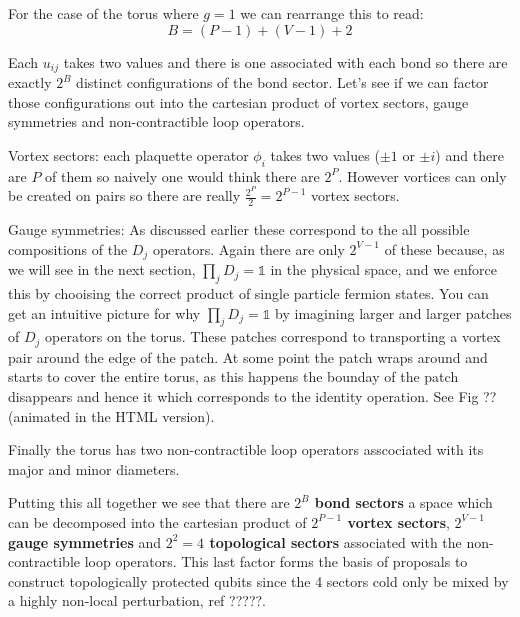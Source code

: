 For the case of the torus where \(g = 1\) we can rearrange this to read:
\[B = (P-1) + (V-1) + 2\]

Each \(u_{ij}\) takes two values and there is one associated with each
bond so there are exactly \(2^B\) distinct configurations of the bond
sector. Let's see if we can factor those configurations out into the
cartesian product of vortex sectors, gauge symmetries and
non-contractible loop operators.

Vortex sectors: each plaquette operator \(\phi_i\) takes two values
(\(\pm 1\) or \(\pm i\)) and there are \(P\) of them so naively one
would think there are \(2^P\). However vortices can only be created on
pairs so there are really \(\tfrac{2^P}{2} = 2^{P-1}\) vortex sectors.

Gauge symmetries: As discussed earlier these correspond to the all
possible compositions of the \(D_j\) operators. Again there are only
\(2^{V-1}\) of these because, as we will see in the next section,
\(\prod_{j} D_j = \mathbb{1}\) in the physical space, and we enforce
this by chooising the correct product of single particle fermion states.
You can get an intuitive picture for why \(\prod_{j} D_j = \mathbb{1}\)
by imagining larger and larger patches of \(D_j\) operators on the
torus. These patches correspond to transporting a vortex pair around the
edge of the patch. At some point the patch wraps around and starts to
cover the entire torus, as this happens the bounday of the patch
disappears and hence it which corresponds to the identity operation. See
Fig ?? (animated in the HTML version).

Finally the torus has two non-contractible loop operators asscociated
with its major and minor diameters.

Putting this all together we see that there are \textbf{\(2^B\) bond
sectors} a space which can be decomposed into the cartesian product of
\textbf{\(2^{P-1}\) vortex sectors}, \textbf{\(2^{V-1}\) gauge
symmetries} and \textbf{\(2^2 = 4\) topological sectors} associated with
the non-contractible loop operators. This last factor forms the basis of
proposals to construct topologically protected qubits since the 4
sectors cold only be mixed by a highly non-local perturbation, ref
?????.

